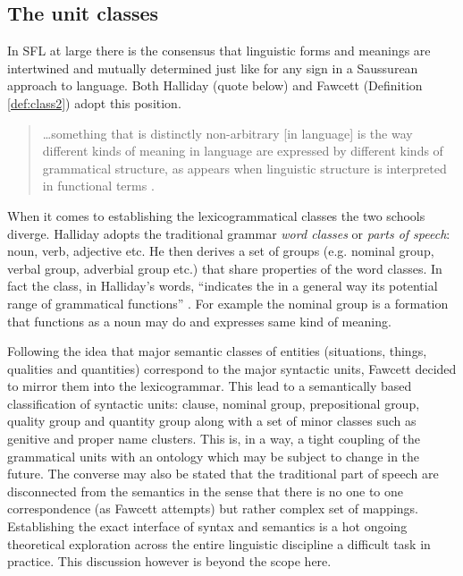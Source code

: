 \subsection{The unit classes}
\label{sec:unit-classes}

In SFL at large there is the consensus that linguistic forms and meanings are intertwined and mutually determined just like for any sign in a Saussurean approach to language. Both Halliday (quote below) and Fawcett (Definition \ref{def:class2}) adopt this position. 

\begin{quotation}
	\dots something that is distinctly non-arbitrary [in language] is the way different kinds of meaning in language are expressed by different kinds of grammatical structure, as appears when linguistic structure is interpreted in functional terms \citep{Halliday2003-Ideas-about-language}.
\end{quotation}

When it comes to establishing the lexicogrammatical classes the two schools diverge. Halliday adopts the traditional grammar \textit{word classes} or \textit{parts of speech}: noun, verb, adjective etc. He then derives a set of groups (e.g. nominal group, verbal group, adverbial group etc.) that share properties of the word classes. In fact the class, in Halliday's words, ``indicates the in a general way its potential range of grammatical functions'' \citep[76]{Halliday2013}. For example the nominal group is a formation that functions as a noun may do and expresses same kind of meaning. 

Following the idea that major semantic classes of entities (situations, things, qualities and quantities) correspond to the major syntactic units, Fawcett decided to mirror them into the lexicogrammar. This lead to a semantically based classification of syntactic units: clause, nominal group, prepositional group, quality group and quantity group \citep[193--194]{Fawcett2000} along with a set of minor classes such as genitive and proper name clusters. This is, in a way, a tight coupling of the grammatical units with an ontology which may be subject to change in the future. The converse may also be stated that the traditional part of speech are disconnected from the semantics in the sense that there is no one to one correspondence (as Fawcett attempts) but rather complex set of mappings. Establishing the exact interface of syntax and semantics is a hot ongoing theoretical exploration across the entire linguistic discipline a difficult task in practice. This discussion however is beyond the scope here.   

